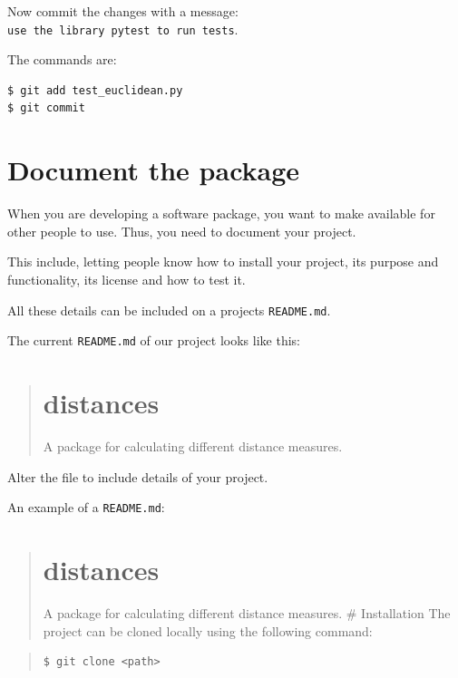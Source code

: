 \documentclass[11pt]{article}
\begin{document}
Now commit the changes with a message:
\texttt{use\ the\ library\ pytest\ to\ run\ tests}.

The commands are:

\begin{verbatim}
$ git add test_euclidean.py
$ git commit
\end{verbatim}

    \hypertarget{document-the-package}{%
\section{Document the package}\label{document-the-package}}

When you are developing a software package, you want to make available
for other people to use. Thus, you need to document your project.

This include, letting people know how to install your project, its
purpose and functionality, its license and how to test it.

All these details can be included on a projects \texttt{README.md}.

The current \texttt{README.md} of our project looks like this:

\begin{quote}
\hypertarget{distances}{%
\section{distances}\label{distances}}

A package for calculating different distance measures.
\end{quote}

Alter the file to include details of your project.

An example of a \texttt{README.md}:

\begin{quote}
\hypertarget{distances-1}{%
\section{distances}\label{distances-1}}

A package for calculating different distance measures. \# Installation
The project can be cloned locally using the following command:
\end{quote}

\begin{quote}
\begin{verbatim}
$ git clone <path>
\end{verbatim}
\end{quote}
\end{document}
